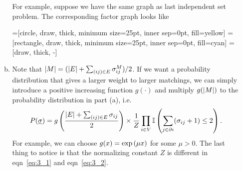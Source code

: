 \documentclass[a4paper,oneside,12pt]{article}
\begin{document}
\begin{itemize}
\begin{solution}
\begin{enumerate}[(a)]
            For example, suppose we have the same graph as last independent set problem.
            The corresponding factor graph looks like
            \begin{center}
            =[circle, draw, thick, minimum size=25pt, inner sep=0pt, fill=yellow]
            =[rectangle, draw, thick, minimum size=25pt, inner sep=0pt, fill=cyan]
             = [draw, thick, -]
            \end{center}
    \item   
            Note that $ \left| M \right| = (\left| E \right| + \sum_{(ij) \in E} \sigma_{ij}^M) / 2 $.
            If we want a probability distribution that gives a larger weight to larger matchings, we can simply introduce a positive increasing function $ g(\cdot) $ and multiply $ g(\left| M \right|) $ to the probability distribution in part (a), i.e.
            \begin{equation} \label{eq:3_2}
                P(\underline{\sigma})
                = g \left(  \frac{\left| E \right| + \sum_{(ij) \in E} \sigma_{ij}}{2}  \right) \times \frac{1}{Z} \prod_{i \in V} \mathbb{I} \left(  \sum_{j \in \partial i} (\sigma_{ij}+1) \le 2  \right).
            \end{equation}
            For example, we can choose $ g(x) = \exp \left(  \mu x  \right) $ for some $ \mu > 0 $.
            The last thing to notice is that the normalizing constant $ Z $ is different in eqn~\ref{eq:3_1} and eqn~\ref{eq:3_2}.
    \end{enumerate}
    \end{solution}

\end{itemize}
\end{document}

